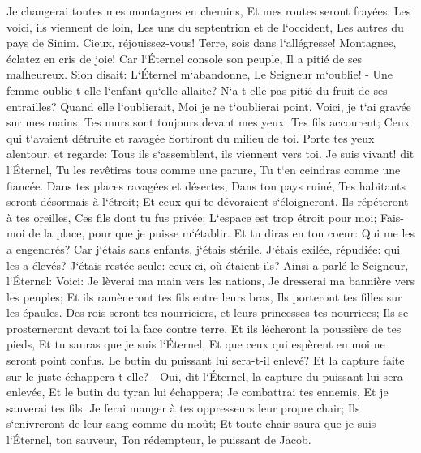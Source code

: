 \verse Je changerai toutes mes montagnes en chemins, Et mes routes seront frayées. 
\verse Les voici, ils viennent de loin, Les uns du septentrion et de l`occident, Les autres du pays de Sinim. 
\verse Cieux, réjouissez-vous! Terre, sois dans l`allégresse! Montagnes, éclatez en cris de joie! Car l`Éternel console son peuple, Il a pitié de ses malheureux. 
\verse Sion disait: L`Éternel m`abandonne, Le Seigneur m`oublie! - 
\verse Une femme oublie-t-elle l`enfant qu`elle allaite? N`a-t-elle pas pitié du fruit de ses entrailles? Quand elle l`oublierait, Moi je ne t`oublierai point. 
\verse Voici, je t`ai gravée sur mes mains; Tes murs sont toujours devant mes yeux. 
\verse Tes fils accourent; Ceux qui t`avaient détruite et ravagée Sortiront du milieu de toi. 
\verse Porte tes yeux alentour, et regarde: Tous ils s`assemblent, ils viennent vers toi. Je suis vivant! dit l`Éternel, Tu les revêtiras tous comme une parure, Tu t`en ceindras comme une fiancée. 
\verse Dans tes places ravagées et désertes, Dans ton pays ruiné, Tes habitants seront désormais à l`étroit; Et ceux qui te dévoraient s`éloigneront. 
\verse Ils répéteront à tes oreilles, Ces fils dont tu fus privée: L`espace est trop étroit pour moi; Fais-moi de la place, pour que je puisse m`établir. 
\verse Et tu diras en ton coeur: Qui me les a engendrés? Car j`étais sans enfants, j`étais stérile. J`étais exilée, répudiée: qui les a élevés? J`étais restée seule: ceux-ci, où étaient-ils? 
\verse Ainsi a parlé le Seigneur, l`Éternel: Voici: Je lèverai ma main vers les nations, Je dresserai ma bannière vers les peuples; Et ils ramèneront tes fils entre leurs bras, Ils porteront tes filles sur les épaules. 
\verse Des rois seront tes nourriciers, et leurs princesses tes nourrices; Ils se prosterneront devant toi la face contre terre, Et ils lécheront la poussière de tes pieds, Et tu sauras que je suis l`Éternel, Et que ceux qui espèrent en moi ne seront point confus. 
\verse Le butin du puissant lui sera-t-il enlevé? Et la capture faite sur le juste échappera-t-elle? - 
\verse Oui, dit l`Éternel, la capture du puissant lui sera enlevée, Et le butin du tyran lui échappera; Je combattrai tes ennemis, Et je sauverai tes fils. 
\verse Je ferai manger à tes oppresseurs leur propre chair; Ils s`enivreront de leur sang comme du moût; Et toute chair saura que je suis l`Éternel, ton sauveur, Ton rédempteur, le puissant de Jacob. 

